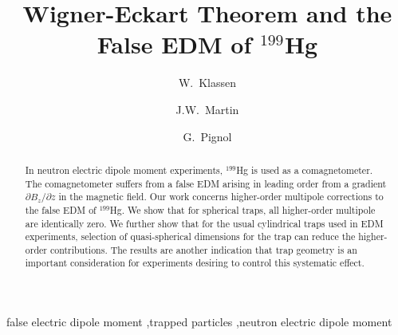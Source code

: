 \documentclass[preprint,12pt]{elsarticle}
\begin{document}
\begin{frontmatter}


\title{Wigner-Eckart Theorem and the False EDM of $^{199}$Hg}




\author[um]{W.~Klassen}
\author[uw,um]{J.W.~Martin}
\author[lspc]{G.~Pignol}

\address[um]{Physics and Astronomy, University of Manitoba, Winnipeg, MB, Canada}
\address[uw]{Department of Physics, The University of Winnipeg, Winnipeg, MB, Canada}
\address[lspc]{Universit\'e Grenoble Alpes, CNRS, Grenoble INP, LPSC-IN2P3, Grenoble, France}

\begin{abstract}
  In neutron electric dipole moment experiments, $^{199}$Hg is used as
  a comagnetometer.  The comagnetometer suffers from a false EDM
  arising in leading order from a gradient $\partial B_{z}/\partial z$
  in the magnetic field.  Our work concerns higher-order multipole
  corrections to the false EDM of $^{199}$Hg.  We show that for
  spherical traps, all higher-order multipole are identically zero.
  We further show that for the usual cylindrical traps used in EDM
  experiments, selection of quasi-spherical dimensions for the trap
  can reduce the higher-order contributions.  The results are another
  indication that trap geometry is an important consideration for
  experiments desiring to control this systematic effect.
\end{abstract}

\begin{keyword}
false electric dipole moment \sep trapped particles \sep neutron electric dipole moment


\end{keyword}

\end{frontmatter}
\end{document}
